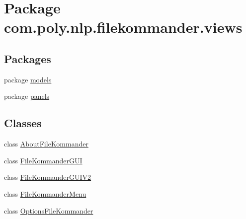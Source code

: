 \hypertarget{namespacecom_1_1poly_1_1nlp_1_1filekommander_1_1views}{\section{Package com.\-poly.\-nlp.\-filekommander.\-views}
\label{namespacecom_1_1poly_1_1nlp_1_1filekommander_1_1views}
}
\subsection*{Packages}
\begin{DoxyCompactItemize}
\item 
package \hyperlink{namespacecom_1_1poly_1_1nlp_1_1filekommander_1_1views_1_1models}{models}
\item 
package \hyperlink{namespacecom_1_1poly_1_1nlp_1_1filekommander_1_1views_1_1panels}{panels}
\end{DoxyCompactItemize}
\subsection*{Classes}
\begin{DoxyCompactItemize}
\item 
class \hyperlink{classcom_1_1poly_1_1nlp_1_1filekommander_1_1views_1_1_about_file_kommander}{About\-File\-Kommander}
\item 
class \hyperlink{classcom_1_1poly_1_1nlp_1_1filekommander_1_1views_1_1_file_kommander_g_u_i}{File\-Kommander\-G\-U\-I}
\item 
class \hyperlink{classcom_1_1poly_1_1nlp_1_1filekommander_1_1views_1_1_file_kommander_g_u_i_v2}{File\-Kommander\-G\-U\-I\-V2}
\item 
class \hyperlink{classcom_1_1poly_1_1nlp_1_1filekommander_1_1views_1_1_file_kommander_menu}{File\-Kommander\-Menu}
\item 
class \hyperlink{classcom_1_1poly_1_1nlp_1_1filekommander_1_1views_1_1_options_file_kommander}{Options\-File\-Kommander}
\end{DoxyCompactItemize}
